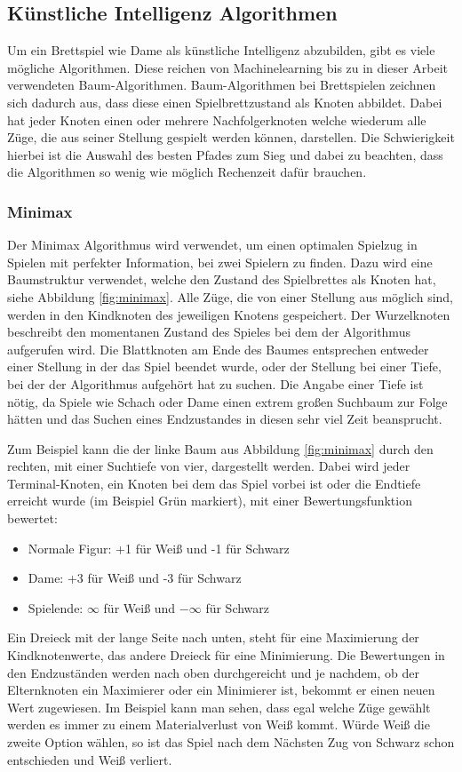 \documentclass[12pt,a4paper,bibliography=totocnumbered,listof=totocnumbered]{article}
\begin{document}
\subsection{Künstliche Intelligenz Algorithmen}
Um ein Brettspiel wie Dame als künstliche Intelligenz abzubilden, gibt es viele mögliche Algorithmen.
Diese reichen von Machinelearning bis zu in dieser Arbeit verwendeten Baum-Algorithmen.
Baum-Algorithmen bei Brettspielen zeichnen sich dadurch aus, dass diese einen Spielbrettzustand als Knoten abbildet.
Dabei hat jeder Knoten einen oder mehrere Nachfolgerknoten welche wiederum alle Züge, die aus seiner Stellung gespielt werden können, darstellen.
Die Schwierigkeit hierbei ist die Auswahl des besten Pfades zum Sieg und dabei zu beachten, dass die Algorithmen so wenig wie möglich 
Rechenzeit dafür brauchen.

\subsubsection{Minimax}
\label{chap:Minimax}
Der Minimax Algorithmus wird verwendet, um einen optimalen Spielzug in Spielen mit perfekter Information, bei zwei Spielern
zu finden. Dazu wird eine Baumstruktur verwendet, welche den Zustand des Spielbrettes als Knoten hat, siehe Abbildung \ref{fig:minimax}.
Alle Züge, die von einer Stellung aus möglich sind, werden in den Kindknoten des jeweiligen Knotens gespeichert.
Der Wurzelknoten beschreibt den momentanen Zustand des Spieles bei dem der Algorithmus aufgerufen wird. Die Blattknoten am Ende des Baumes
entsprechen entweder einer Stellung in der das Spiel beendet wurde, oder der Stellung bei einer Tiefe, bei der der Algorithmus 
aufgehört hat zu suchen. Die Angabe einer Tiefe ist nötig,
da Spiele wie Schach oder Dame einen extrem großen Suchbaum zur Folge hätten und das Suchen eines Endzustandes in diesen sehr viel Zeit
beansprucht. \cite{MinimaxComparison}


Zum Beispiel kann die der linke Baum aus Abbildung \ref{fig:minimax} durch den rechten, mit einer Suchtiefe von vier, dargestellt werden.
Dabei wird jeder Terminal-Knoten, ein Knoten bei dem das Spiel vorbei ist oder die Endtiefe erreicht wurde (im Beispiel Grün markiert), 
mit einer Bewertungsfunktion bewertet:
\begin{itemize}
    \item Normale Figur: +1 für Weiß und -1 für Schwarz
    \item Dame: +3 für Weiß und -3 für Schwarz
    \item Spielende: $\infty$ für Weiß und $-\infty$ für Schwarz
\end{itemize} 
Ein Dreieck mit der lange Seite nach unten, steht für eine Maximierung der Kindknotenwerte, das andere Dreieck für eine
Minimierung. Die Bewertungen in den Endzuständen werden nach oben durchgereicht und je nachdem, ob der Elternknoten ein Maximierer oder ein
Minimierer ist, bekommt er einen neuen Wert zugewiesen.
Im Beispiel kann man sehen, dass egal welche Züge gewählt werden es immer zu einem Materialverlust von Weiß kommt. Würde Weiß
die zweite Option wählen, so ist das Spiel nach dem Nächsten Zug von Schwarz schon entschieden und Weiß verliert. 
\end{document}
